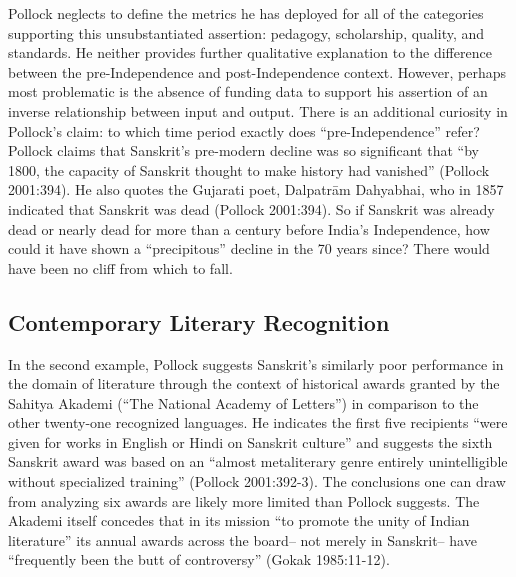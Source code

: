 Pollock neglects to define the metrics he has deployed for all of the categories supporting this unsubstantiated assertion: pedagogy, scholarship, quality, and standards. He neither provides further qualitative explanation to the difference between the pre-Independence and post-Independence context. However, perhaps most problematic is the absence of funding data to support his assertion of an inverse relationship between input and output. There is an additional curiosity in Pollock’s claim: to which time period exactly does “pre-Independence” refer? Pollock claims that Sanskrit’s pre-modern decline was so significant that “by 1800, the capacity of Sanskrit thought to make history had vanished” (Pollock 2001:394). He also quotes the Gujarati poet, Dalpatrām Dahyabhai, who in 1857 indicated that Sanskrit was dead (Pollock 2001:394). So if Sanskrit was already dead or nearly dead for more than a century before India’s Independence, how could it have shown a “precipitous” decline in the 70 years since? There would have been no cliff from which to fall.

\subsection*{Contemporary Literary Recognition}
 
In the second example, Pollock suggests Sanskrit’s similarly poor performance in the domain of literature through the context of historical awards granted by the Sahitya Akademi (“The National Academy of Letters”) in comparison to the other twenty-one recognized languages. He indicates the first five recipients “were given for works in English or Hindi on Sanskrit culture” and suggests the sixth Sanskrit award was based on an “almost metaliterary genre entirely unintelligible without specialized training” (Pollock 2001:392-3). The conclusions one can draw from analyzing six awards are likely more limited than Pollock suggests. The Akademi itself concedes that in its mission “to promote the unity of Indian literature” its annual awards across the board-- not merely in Sanskrit-- have “frequently been the butt of controversy” (Gokak 1985:11-12).

